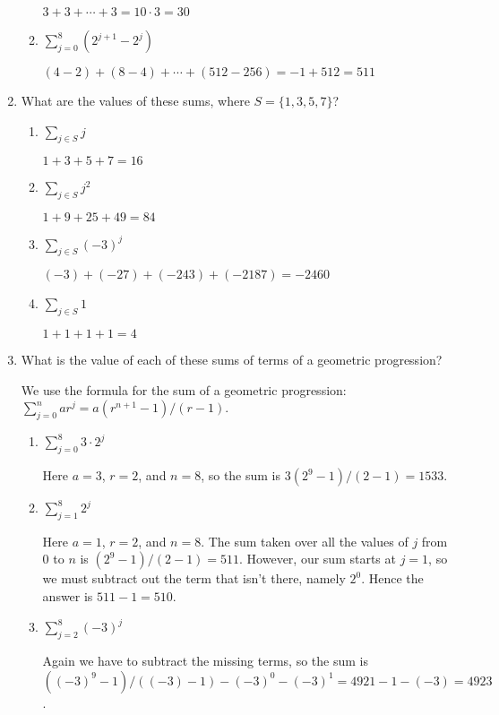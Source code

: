 \documentclass[11pt]{article}
\begin{document}
\begin{enumerate}[label=\textbf{\arabic*.}]
\begin{enumerate}[label=\textbf{\alph*)}]
		$3 + 3 + \cdots + 3 = 10 \cdot 3 = 30$
		
		\item $\sum_{j = 0}^{8} (2^{j + 1} - 2^j)$
		
		$(4 - 2) + (8 - 4) + \cdots + (512 - 256) = -1 + 512 = 511$
	\end{enumerate}

	\item What are the values of these sums, where $S = \{1, 3, 5, 7\}$?
	
	\begin{enumerate}[label=\textbf{\alph*)}]
		\item $\sum_{j \in S} j$
		
		$1 + 3 + 5 + 7 = 16$
		
		\item $\sum_{j \in S} j^2$
		
		$1 + 9 + 25 + 49 = 84$
		
		\item $\sum_{j \in S} (-3)^j$
		
		$(-3) + (-27) + (-243) + (-2187) = -2460$
		
		\item $\sum_{j \in S} 1$
		
		$1 + 1 + 1 + 1 = 4$
	\end{enumerate}

	\item What is the value of each of these sums of terms of a geometric progression?
	
	We use the formula for the sum of a geometric progression: $\sum_{j = 0}^{n} ar^j = a(r^{n + 1} - 1) / (r - 1)$.
	
	\begin{enumerate}[label=\textbf{\alph*)}]
		\item $\sum_{j = 0}^{8} 3 \cdot 2^j$
		
		Here $a = 3$, $r = 2$, and $n = 8$, so the sum is $3(2^9 - 1) / (2 - 1) = 1533$.
		
		\item $\sum_{j = 1}^{8} 2^j$
		
		Here $a = 1$, $r = 2$, and $n = 8$. The sum taken over all the values of $j$ from 0 to $n$ is $(2^9 - 1) / (2 - 1) = 511$. However, our sum starts at $j = 1$, so we must subtract out the term that isn't there, namely $2^0$. Hence the answer is $511 - 1 = 510$.
		
		\item $\sum_{j = 2}^{8} (-3)^j$
		
		Again we have to subtract the missing terms, so the sum is $((-3)^9 - 1) / ((-3) - 1) - (-3)^0 - (-3)^1 = 4921 - 1 - (-3) = 4923$.
		

\end{enumerate}
\end{enumerate}
\end{document}
